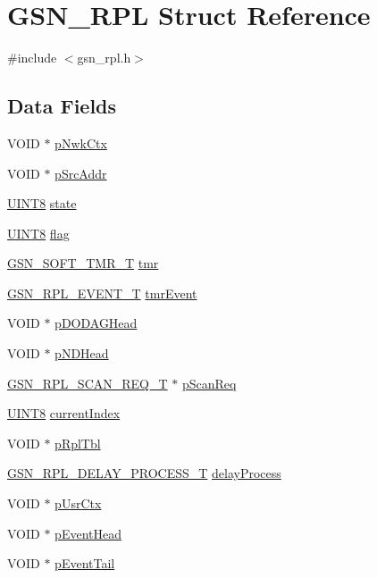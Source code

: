 \hypertarget{a00192}{
\section{GSN\_\-RPL Struct Reference}
\label{a00192}
}


{\ttfamily \#include $<$gsn\_\-rpl.h$>$}

\subsection*{Data Fields}
\begin{DoxyCompactItemize}
\item 
VOID $\ast$ \hyperlink{a00192_a61296c752ce7703e4fd3a188b913e15f}{pNwkCtx}
\item 
VOID $\ast$ \hyperlink{a00192_a536c3496528ac97836a945c9207873e2}{pSrcAddr}
\item 
\hyperlink{a00660_gab27e9918b538ce9d8ca692479b375b6a}{UINT8} \hyperlink{a00192_a6e9c4cbd32a1178b12f3a61f6855c896}{state}
\item 
\hyperlink{a00660_gab27e9918b538ce9d8ca692479b375b6a}{UINT8} \hyperlink{a00192_a5f8f2b25ad9606164f92acb3cfa6b40b}{flag}
\item 
\hyperlink{a00229}{GSN\_\-SOFT\_\-TMR\_\-T} \hyperlink{a00192_a7947cb3f25585c0d1d74f29106585d1d}{tmr}
\item 
\hyperlink{a00200}{GSN\_\-RPL\_\-EVENT\_\-T} \hyperlink{a00192_aabb98c76e20a07a00dd54e144a095487}{tmrEvent}
\item 
VOID $\ast$ \hyperlink{a00192_a84425b28ccce31b39199fdc85ef89e5c}{pDODAGHead}
\item 
VOID $\ast$ \hyperlink{a00192_a25d31e9fd9b291f73cce2b8172dc2aef}{pNDHead}
\item 
\hyperlink{a00209}{GSN\_\-RPL\_\-SCAN\_\-REQ\_\-T} $\ast$ \hyperlink{a00192_a8cc5c2e4dc3b9767775f934bcb36b98d}{pScanReq}
\item 
\hyperlink{a00660_gab27e9918b538ce9d8ca692479b375b6a}{UINT8} \hyperlink{a00192_ae5816df60fa5aa70b963fcd4df337522}{currentIndex}
\item 
VOID $\ast$ \hyperlink{a00192_a3113ce3fa4fc63f204aa2d6902088a66}{pRplTbl}
\item 
\hyperlink{a00579_af0ccdfb14b5152fb661e14482e16d4e7}{GSN\_\-RPL\_\-DELAY\_\-PROCESS\_\-T} \hyperlink{a00192_acd423b16a3f71c783b514c886237d2c1}{delayProcess}
\item 
VOID $\ast$ \hyperlink{a00192_a69a1fecfdd0530957db9846f92c04766}{pUsrCtx}
\item 
VOID $\ast$ \hyperlink{a00192_a47ec1a774c77852d6a1072e13766b36c}{pEventHead}
\item 
VOID $\ast$ \hyperlink{a00192_a4c9c903e4b7f0f16aabfb6607702e294}{pEventTail}
\end{DoxyCompactItemize}


